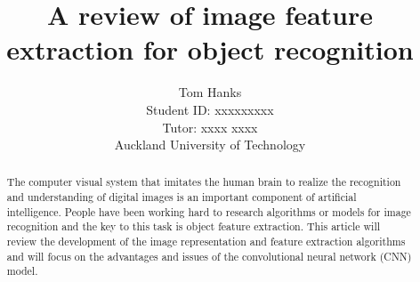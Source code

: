 \documentclass[10pt, a4paper]{IEEEtran} %
\title{A review of image feature extraction for object recognition}
\date{}
\author{Tom Hanks \\ Student ID: xxxxxxxxx \\Tutor: xxxx xxxx\\Auckland University of Technology}
\begin{document}
	\maketitle
	
	\begin{abstract} %
	The computer visual system that imitates the human brain to realize the recognition and understanding of digital images is an important component of artificial intelligence. People have been working hard to research algorithms or models for image recognition and the key to this task is object feature extraction. This article will review the development of the image representation and feature extraction algorithms and will focus on the advantages and issues of the convolutional neural network (CNN) model.
	\end{abstract}


\end{document}
